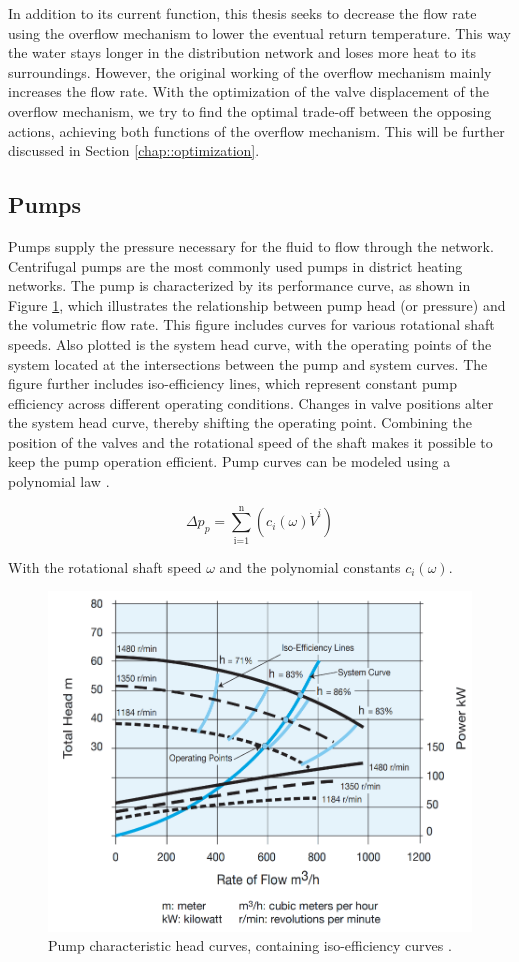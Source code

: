 
 
In addition to its current function, this thesis seeks to decrease the flow rate using the overflow mechanism to lower the eventual return temperature. This way the water stays longer in the distribution network and loses more heat to its surroundings. However, the original working of the overflow mechanism mainly increases the flow rate. With the optimization of the valve displacement of the overflow mechanism, we try to find the optimal trade-off between the opposing actions, achieving both functions of the overflow mechanism. This will be further discussed in Section \ref{chap::optimization}.

\subsection{Pumps}
Pumps supply the pressure necessary for the fluid to flow through the network. Centrifugal pumps are the most commonly used pumps in district heating networks. The pump is characterized by its performance curve, as shown in Figure \ref{fig::pumpcharacteristic}, which illustrates the relationship between pump head (or pressure) and the volumetric flow rate. This figure includes curves for various rotational shaft speeds. Also plotted is the system head curve, with the operating points of the system located at the intersections between the pump and system curves. The figure further includes iso-efficiency lines, which represent constant pump efficiency across different operating conditions. Changes in valve positions alter the system head curve, thereby shifting the operating point. Combining the position of the valves and the rotational speed of the shaft makes it possible to keep the pump operation efficient. Pump curves can be modeled using a polynomial law \cite{echtephdthesis}. 

\begin{equation}\label{eq::pumpchar}
    \Delta p_{p} = \sum^{\text{n}}_{\text{i=1}} \left( c_i(\omega)  \dot{V}^{i} \right)
\end{equation}

With the rotational shaft speed $\omega$ and the polynomial constants $c_i(\omega)$. 

\begin{figure}[h!]
    \centering
    \includegraphics[width=0.6\linewidth]{Literature Survey - DCSC template/figuresLIT/pumpgoed.png}
    \caption{Pump characteristic head curves, containing iso-efficiency curves \cite{pumpcharacteristics}.}
    \label{fig::pumpcharacteristic}
\end{figure}

